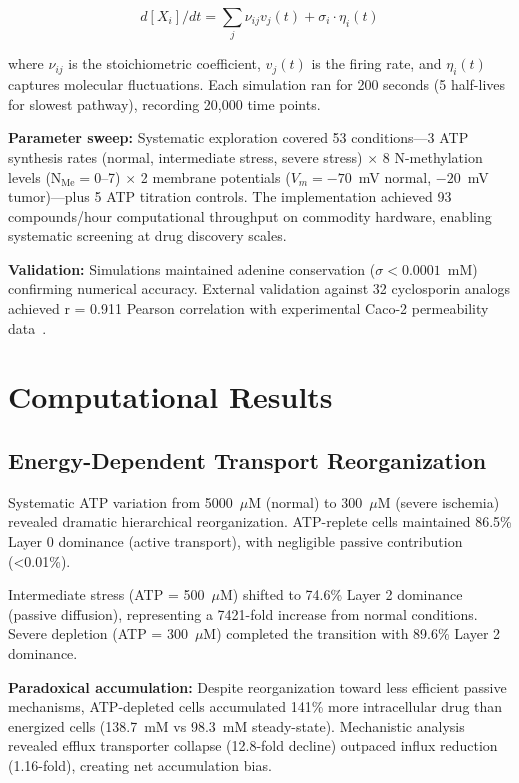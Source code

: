 \documentclass[10pt,letterpaper]{article}
\begin{document}
\begin{equation}
\label{eq:langevin}
d[X_i]/dt = \sum_j \nu_{ij} v_j(t) + \sigma_i \cdot \eta_i(t)
\end{equation}

where $\nu_{ij}$ is the stoichiometric coefficient, $v_j(t)$ is the firing rate, and $\eta_i(t)$ captures molecular fluctuations. Each simulation ran for 200 seconds (5 half-lives for slowest pathway), recording 20,000 time points.

\textbf{Parameter sweep:} Systematic exploration covered 53 conditions---3 ATP synthesis rates (normal, intermediate stress, severe stress) $\times$ 8 N-methylation levels (N$_{\text{Me}} = 0$--7) $\times$ 2 membrane potentials ($V_m = -70$~mV normal, $-20$~mV tumor)---plus 5 ATP titration controls. The implementation achieved 93 compounds/hour computational throughput on commodity hardware, enabling systematic screening at drug discovery scales.

\textbf{Validation:} Simulations maintained adenine conservation ($\sigma < 0.0001$~mM) confirming numerical accuracy. External validation against 32 cyclosporin analogs achieved r = 0.911 Pearson correlation with experimental Caco-2 permeability data~\cite{Doak2014}.

\section{Computational Results}
\label{sec:results}

\subsection{Energy-Dependent Transport Reorganization}

Systematic ATP variation from 5000~$\mu$M (normal) to 300~$\mu$M (severe ischemia) revealed dramatic hierarchical reorganization. ATP-replete cells maintained 86.5\% Layer 0 dominance (active transport), with negligible passive contribution (<0.01\%). 

Intermediate stress (ATP = 500~$\mu$M) shifted to 74.6\% Layer 2 dominance (passive diffusion), representing a 7421-fold increase from normal conditions. Severe depletion (ATP = 300~$\mu$M) completed the transition with 89.6\% Layer 2 dominance.

\textbf{Paradoxical accumulation:} Despite reorganization toward less efficient passive mechanisms, ATP-depleted cells accumulated 141\% more intracellular drug than energized cells (138.7~mM vs 98.3~mM steady-state). Mechanistic analysis revealed efflux transporter collapse (12.8-fold decline) outpaced influx reduction (1.16-fold), creating net accumulation bias.
\end{document}

